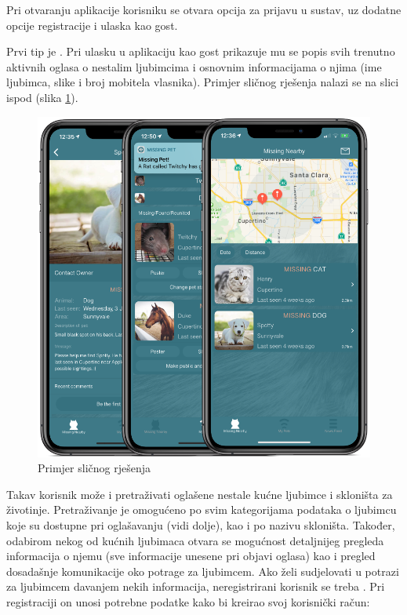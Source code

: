 Pri otvaranju aplikacije korisniku se otvara opcija za prijavu u sustav, uz dodatne opcije registracije i ulaska kao gost.

		Prvi tip je . Pri ulasku u aplikaciju kao gost prikazuje mu se popis svih trenutno aktivnih oglasa o nestalim ljubimcima i osnovnim informacijama o njima (ime ljubimca, slike i broj mobitela vlasnika). Primjer sličnog rješenja nalazi se na slici ispod (slika \ref{fig:slika1}).

		\begin{figure}[H]
			\includegraphics[scale=0.4]{slike/ljubimci.PNG} %
			\centering
			\caption{Primjer sličnog rješenja}
			\label{fig:slika1}
		\end{figure}

		Takav korisnik može i pretraživati oglašene nestale kućne ljubimce i skloništa za životinje. Pretraživanje je omogućeno po svim kategorijama podataka o ljubimcu koje su dostupne pri oglašavanju (vidi dolje), kao i po nazivu skloništa. Također, odabirom nekog od kućnih ljubimaca otvara se mogućnost detaljnijeg pregleda informacija o njemu (sve informacije unesene pri objavi oglasa) kao i pregled dosadašnje komunikacije oko potrage za ljubimcem.
Ako želi sudjelovati u potrazi za ljubimcem davanjem nekih informacija, neregistrirani korisnik se treba . Pri registraciji on unosi potrebne podatke kako bi kreirao svoj korisnički račun:

